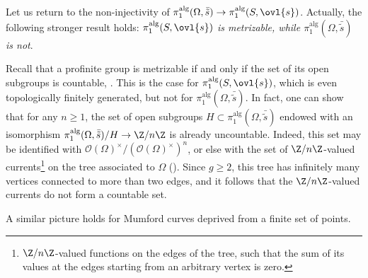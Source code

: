 \begin{para}
 Let us return to the non-injectivity of
 $\pi_1^{\mathrm{alg}}(\Omega,\bar{\tilde s})\to
 \pi_1^{\mathrm{alg}}(S,\ovl{s})$. Actually, the 
 following stronger result holds: {\it $\pi_1^{\mathrm{alg}}(S,\ovl{s})$
 is metrizable, while $\pi_1^{\mathrm{alg}}(\Omega,\bar{\tilde s})$ is 
 not}.  

 \noindent Recall that a profinite group is metrizable if and only if the
 set of its open subgroups is countable, 
 \cf \cite[1.3]{serre94:_cohom}. This is the case for
 $\pi_1^{\mathrm{alg}}(S,\ovl{s})$, which is even topologically finitely
 generated, but 
 not for $\pi_1^{\mathrm{alg}}(\Omega,\bar{\tilde s})$. In fact, one can
 show that for any 
 $n\geq 1$, the set of open subgroups $H\subset
 \pi_1^{\mathrm{alg}}(\Omega,\bar{\tilde s})$ endowed with an isomorphism
 $\pi_1^{\mathrm{alg}}(\Omega,\bar{\tilde s})/H\to \Z/n\Z$ is already
 uncountable. Indeed, this set may be identified with
 $\mathcal{O}(\Omega)^\times/(\mathcal{O}(\Omega)^\times)^n$, or else
 with the set of $\Z/n\Z$-valued 
 currents\footnote{\ie $\Z/n\Z$-valued functions on the edges of the
 tree, such that the sum of its values at the edges starting from an 
 arbitrary vertex is zero.} on the tree associated to
 $\Omega$ (\cf \cite[I.8.9, V.2.3]{garea}). Since $g\geq 2$, this 
 tree has infinitely many vertices connected to more than 
 two edges, and it follows that the $\Z/n\Z$-valued currents do not form
 a countable set.  

 A similar picture holds for Mumford curves deprived from a
 finite set of points.
\end{para}

